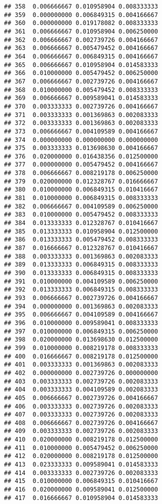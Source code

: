 \documentclass[
]{article}
\begin{document}
\begin{verbatim}
## 358  0.006666667 0.010958904 0.008333333
## 359  0.000000000 0.006849315 0.004166667
## 360  0.000000000 0.019178082 0.008333333
## 361  0.006666667 0.010958904 0.006250000
## 362  0.006666667 0.002739726 0.004166667
## 363  0.006666667 0.005479452 0.004166667
## 364  0.006666667 0.006849315 0.004166667
## 365  0.006666667 0.010958904 0.014583333
## 366  0.010000000 0.005479452 0.006250000
## 367  0.006666667 0.002739726 0.004166667
## 368  0.010000000 0.005479452 0.008333333
## 369  0.006666667 0.009589041 0.014583333
## 370  0.003333333 0.002739726 0.004166667
## 371  0.003333333 0.001369863 0.002083333
## 372  0.003333333 0.001369863 0.002083333
## 373  0.006666667 0.004109589 0.004166667
## 374  0.000000000 0.000000000 0.000000000
## 375  0.003333333 0.013698630 0.004166667
## 376  0.020000000 0.016438356 0.012500000
## 377  0.000000000 0.005479452 0.004166667
## 378  0.006666667 0.008219178 0.006250000
## 379  0.020000000 0.012328767 0.016666667
## 380  0.010000000 0.006849315 0.010416667
## 381  0.010000000 0.006849315 0.008333333
## 382  0.006666667 0.004109589 0.006250000
## 383  0.010000000 0.005479452 0.008333333
## 384  0.013333333 0.012328767 0.010416667
## 385  0.013333333 0.010958904 0.012500000
## 386  0.013333333 0.005479452 0.008333333
## 387  0.016666667 0.012328767 0.010416667
## 388  0.003333333 0.001369863 0.002083333
## 389  0.013333333 0.006849315 0.008333333
## 390  0.013333333 0.006849315 0.008333333
## 391  0.010000000 0.004109589 0.006250000
## 392  0.013333333 0.006849315 0.008333333
## 393  0.006666667 0.002739726 0.004166667
## 394  0.000000000 0.001369863 0.002083333
## 395  0.006666667 0.004109589 0.004166667
## 396  0.010000000 0.009589041 0.008333333
## 397  0.010000000 0.006849315 0.006250000
## 398  0.020000000 0.013698630 0.012500000
## 399  0.010000000 0.008219178 0.008333333
## 400  0.016666667 0.008219178 0.012500000
## 401  0.003333333 0.001369863 0.002083333
## 402  0.000000000 0.002739726 0.000000000
## 403  0.003333333 0.002739726 0.002083333
## 404  0.003333333 0.004109589 0.002083333
## 405  0.006666667 0.002739726 0.004166667
## 406  0.003333333 0.002739726 0.002083333
## 407  0.003333333 0.002739726 0.002083333
## 408  0.006666667 0.002739726 0.004166667
## 409  0.003333333 0.002739726 0.002083333
## 410  0.020000000 0.008219178 0.012500000
## 411  0.010000000 0.005479452 0.006250000
## 412  0.020000000 0.008219178 0.012500000
## 413  0.023333333 0.009589041 0.014583333
## 414  0.003333333 0.002739726 0.002083333
## 415  0.010000000 0.006849315 0.010416667
## 416  0.020000000 0.009589041 0.012500000
## 417  0.016666667 0.010958904 0.014583333

\end{verbatim}
\end{document}
